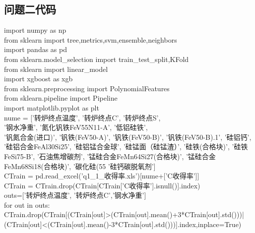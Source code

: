 \documentclass{xcumcmart}
\begin{document}
\subsection{问题二代码}
\noindent
import numpy as np  \\
from sklearn import tree,metrics,svm,ensemble,neighbors  \\
import pandas as pd  \\
from sklearn.model\_selection import train\_test\_split,KFold  \\
from sklearn import linear\_model  \\
import xgboost as xgb  \\
from sklearn.preprocessing import PolynomialFeatures  \\
from sklearn.pipeline import Pipeline  \\
import matplotlib.pyplot as plt  \\
nume = ['转炉终点温度', '转炉终点C', '转炉终点S',  \\
        '钢水净重', '氮化钒铁FeV55N11-A', '低铝硅铁',  \\
       '钒氮合金(进口)', '钒铁(FeV50-A)', '钒铁(FeV50-B)', '钒铁(FeV50-B).1', '硅铝钙',  \\
       '硅铝合金FeAl30Si25', '硅铝锰合金球', '硅锰面（硅锰渣）', '硅铁(合格块)', '硅铁FeSi75-B',
       '石油焦增碳剂', '锰硅合金FeMn64Si27(合格块)', '锰硅合金FeMn68Si18(合格块)', '碳化硅(55%
       '硅钙碳脱氧剂']  \\
CTrain = pd.read\_excel('q1\_1\_收得率.xls')[nume+['C收得率']]  \\
CTrain = CTrain.drop(CTrain[CTrain['C收得率'].isnull()].index)  \\
outs=['转炉终点温度', '转炉终点C','钢水净重']  \\
for out in outs:  \\
    CTrain.drop(CTrain[(CTrain[out]>(CTrain[out].mean()+3*CTrain[out].std()))|(CTrain[out]<(CTrain[out].mean()-3*CTrain[out].std()))].index,inplace=True)  \\
    
\end{document}
